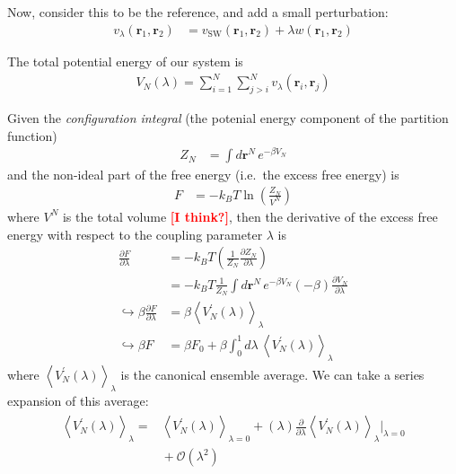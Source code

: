 \documentclass[letterpaper,twocolumn,amsmath,amssymb,prb]{revtex4-1}
\newcommand{\kT}{\ensuremath{k_BT}}
\newcommand{\1}{\ensuremath{\textbf{r}_1}}
\newcommand{\2}{\ensuremath{\textbf{r}_2}}
\newcommand{\3}{\ensuremath{\textbf{r}_3}}
\newcommand{\4}{\ensuremath{\textbf{r}_4}}
\newcommand{\fixme}[1]{\textcolor{red}{\textbf{[#1]}}}
\begin{document}
Now, consider this to be the reference, and add a small perturbation:
\begin{align}
  v_\lambda(\1,\2) &= v_\text{SW}(\1,\2) + \lambda w(\1,\2) \label{eqn:small-perturbation}
\end{align}

The total potential energy of our system is
\begin{align}
  V_N(\lambda) = \sum_{i=1}^N\sum_{j>i}^N v_\lambda(\mathbf{r}_i,\mathbf{r}_j)
\end{align}

Given the \emph{configuration integral} (the potenial energy component of the partition function)
\begin{align}
  Z_N &= \int d\mathbf{r}^N\, e^{-\beta V_N}
\end{align}
and the non-ideal part of the free energy (i.e.~the excess free energy) is
\begin{align}
  F &= -\kT\ln\left( \frac{Z_N}{V^N} \right)
\end{align}
where $V^N$ is the total volume \fixme{I think?}, then the derivative of the excess free energy with respect to the coupling parameter $\lambda$ is
\begin{align}
  \frac{\partial F}{\partial\lambda} &= -\kT\left( \frac{1}{Z_N}\frac{\partial Z_N}{\partial\lambda} \right) \\
  &= -\kT\frac{1}{Z_N}\int d\mathbf{r}^N\, e^{-\beta V_N}(-\beta)\frac{\partial V_N}{\partial\lambda} \\
  \hookrightarrow \beta\frac{\partial F}{\partial\lambda} &= \beta\left\langle V_N^{'}(\lambda) \right\rangle_\lambda \\
  \hookrightarrow \beta F &= \beta F_0 + \beta\int_0^1 d\lambda\, \left\langle V_N^{'}(\lambda) \right\rangle_\lambda
\end{align}
where $\left\langle V_N^{'}(\lambda) \right\rangle_\lambda$ is the canonical ensemble average. We can take a series expansion of this average:
\begin{align}\begin{split} %
  \left\langle V_N^{'}(\lambda) \right\rangle_\lambda = &{} \left\langle V_N^{'}(\lambda)\right\rangle_{\lambda = 0} + (\lambda)\frac{\partial}{\partial\lambda}\left\langle V_N^{'}(\lambda) \right\rangle_{\lambda}\bigg|_{\lambda = 0} \\ &{} + \mathcal{O}(\lambda^2)
\end{split}\end{align}
\end{document}
